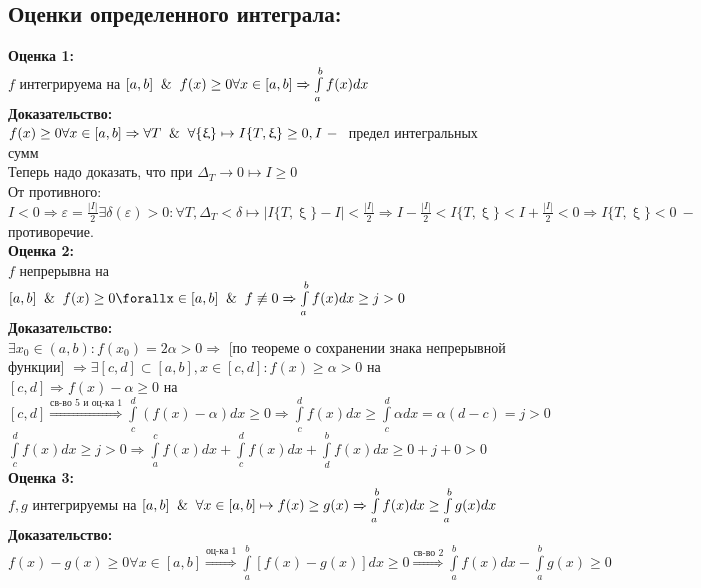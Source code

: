 \documentclass[a4paper,12pt]{article} %
\begin{document}
\begin{enumerate}
\subsection*{Оценки определенного интеграла:}   
\textbf{Оценка 1:}\\[2mm]
    $f$  интегрируема на $[a,b] \And f(x)\geq 0\forall x \in [a,b]\Rightarrow \int\limits_a^b f(x)dx$\\[2mm]
    \textbf{Доказательство:}\\[2mm]
    $f(x)\geq 0 \forall x \in [a,b]\Rightarrow \forall T \And \forall \{\upxi\}\mapsto I\{T,\upxi \}\geq 0, I ~-~$ предел интегральных сумм\\[2mm]
    Теперь надо доказать, что при $\Delta_T \rightarrow 0 \mapsto I\geq 0$ \\[2mm]
    От противного:\\[2mm] 
    $I<0 \Rightarrow \varepsilon = \frac{|I|}{2} \exists\delta(\varepsilon)>0: \forall T, \Delta_T< \delta \mapsto |I\{T,\upxi\}-I|< \frac{|I|}{2}\Rightarrow I-\frac{|I|}{2}<I\{T,\upxi\}<I+\frac{|I|}{2}<0\Rightarrow I\{T,\upxi\}<0 ~-~ $ противоречие.\\[5mm]
    \textbf{Оценка 2:}\\[2mm]
    $f$ непрерывна на $[a,b] \And f(x) \geq 0 \forallx \in [a,b] \And f\not\equiv 0 \Rightarrow \int\limits_a^b f(x)dx \geq j>0$\\[2mm]
    \textbf{Доказательство:}\\[2mm]
    $\exists x_0 \in (a,b): f(x_0) = 2\alpha>0 \Rightarrow$ [по теореме о сохранении знака непрерывной функции] $\Rightarrow \exists [c,d] \subset [a,b], x  \in [c,d]: f(x)\geq \alpha > 0 $ на $[c,d]\Rightarrow f(x)-\alpha \geq 0$ на $[c,d]\stackrel{\text{св-во 5 и оц-ка 1}}{\Rightarrow}\int \limits_c^d (f(x)-\alpha) dx\geq 0 \Rightarrow \int \limits_c^d f(x)dx\geq \int\limits_c^d\alpha dx = \alpha(d-c) = j > 0$\\[2mm]
    $\int \limits_c^d f(x) dx \geq j > 0 \Rightarrow \int \limits_a^c  f(x) dx  + \int \limits_c^d  f(x) dx+ \int \limits_d^b  f(x) dx \geq 0+j+0>0$\\[2mm]
    \textbf{Оценка 3:}\\[2mm]
    $f,g$ интегрируемы на $[a,b] \And \forall x \in [a,b]\mapsto f(x)\geq g(x) \Rightarrow\int \limits_a^b f(x) dx \geq \int \limits_a^b g(x) dx$\\[2mm]
    \textbf{Доказательство:}\\[2mm]
    $f(x)-g(x) \geq 0 \forall x \in [a,b] \stackrel{\text{оц-ка 1}}{\Rightarrow} \int \limits_a^b [f(x)-g(x)]dx\geq 0 \stackrel{\text{св-во 2}}{\Rightarrow}\int \limits_a^b f(x)dx - \int \limits_a^b g(x) \geq 0 $\\[2mm]
    

\end{enumerate}
\end{document}
